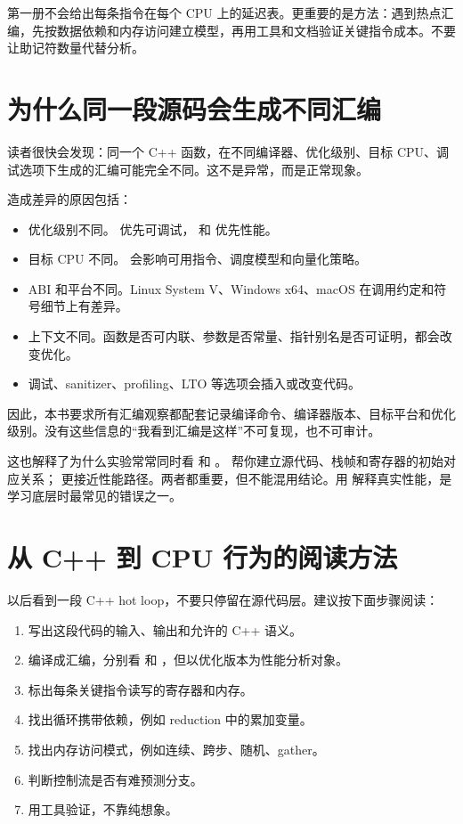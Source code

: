 第一册不会给出每条指令在每个 CPU 上的延迟表。更重要的是方法：遇到热点汇编，先按数据依赖和内存访问建立模型，再用工具和文档验证关键指令成本。不要让助记符数量代替分析。

\section{为什么同一段源码会生成不同汇编}

读者很快会发现：同一个 C++ 函数，在不同编译器、优化级别、目标 CPU、调试选项下生成的汇编可能完全不同。这不是异常，而是正常现象。

造成差异的原因包括：

\begin{itemize}
  \item 优化级别不同。  优先可调试， 和  优先性能。
  \item 目标 CPU 不同。  会影响可用指令、调度模型和向量化策略。
  \item ABI 和平台不同。Linux System V、Windows x64、macOS 在调用约定和符号细节上有差异。
  \item 上下文不同。函数是否可内联、参数是否常量、指针别名是否可证明，都会改变优化。
  \item 调试、sanitizer、profiling、LTO 等选项会插入或改变代码。
\end{itemize}

因此，本书要求所有汇编观察都配套记录编译命令、编译器版本、目标平台和优化级别。没有这些信息的“我看到汇编是这样”不可复现，也不可审计。

这也解释了为什么实验常常同时看  和 。  帮你建立源代码、栈帧和寄存器的初始对应关系； 更接近性能路径。两者都重要，但不能混用结论。用  解释真实性能，是学习底层时最常见的错误之一。

\section{从 C++ 到 CPU 行为的阅读方法}

以后看到一段 C++ hot loop，不要只停留在源代码层。建议按下面步骤阅读：

\begin{enumerate}
  \item 写出这段代码的输入、输出和允许的 C++ 语义。
  \item 编译成汇编，分别看  和 ，但以优化版本为性能分析对象。
  \item 标出每条关键指令读写的寄存器和内存。
  \item 找出循环携带依赖，例如 reduction 中的累加变量。
  \item 找出内存访问模式，例如连续、跨步、随机、gather。
  \item 判断控制流是否有难预测分支。
  \item 用工具验证，不靠纯想象。
\end{enumerate}

